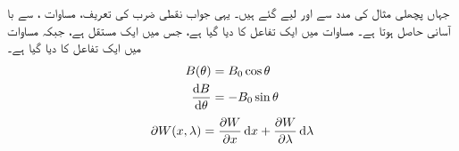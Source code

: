 جہاں پچھلی مثال کی مدد سے  اور  لیے گئے ہیں۔ یہی جواب نقطی ضرب کی تعریف، مساوات ،  سے با آسانی حاصل ہوتا ہے۔
%
مساوات  میں ایک تفاعل  کا  دیا گیا ہے، جس میں  ایک مستقل ہے، جبکہ مساوات   میں ایک تفاعل کا   دیا گیا ہے۔
\begin{gather}
\begin{aligned}\label{مساوات_بنیادی_تفرق}
B (\theta )&=B_0 \cos \theta\\
\frac{\dif B}{\dif \theta}&=-B_0 \sin \theta
\end{aligned}
\end{gather} 
%
\begin{align}\label{مساوات_بنیادی_جزوی_تفرق}
\partial W(x,\lambda)=\frac{\partial W}{\partial x} \dif x+\frac{\partial W}{\partial \lambda} \dif \lambda
\end{align}


